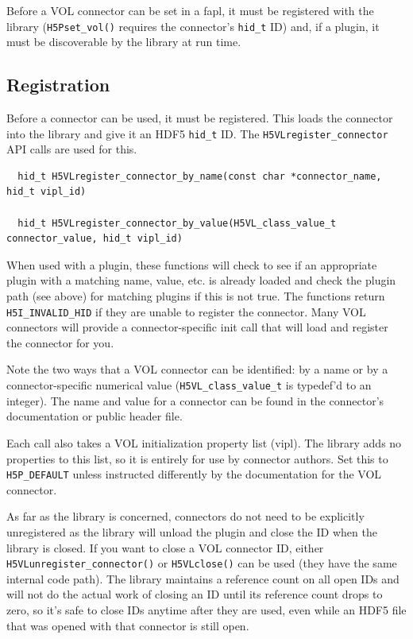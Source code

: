 Before a VOL connector can be set in a fapl, it must be registered with the library ({\tt H5Pset\_vol()} requires the connector's {\tt hid\_t} ID) and, if a plugin, it must be discoverable by the library at run time.

\subsection{Registration}

Before a connector can be used, it must be registered. This loads the connector into the library and give it an HDF5 {\tt hid\_t} ID. The {\tt H5VLregister\_connector} API calls are used for this.

\begin{lstlisting}
  hid_t H5VLregister_connector_by_name(const char *connector_name, hid_t vipl_id)

  hid_t H5VLregister_connector_by_value(H5VL_class_value_t connector_value, hid_t vipl_id)
\end{lstlisting}

When used with a plugin, these functions will check to see if an appropriate plugin with a matching name, value, etc. is already loaded and check the plugin path (see above) for matching plugins if this is not true. The functions return {\tt H5I\_INVALID\_HID} if they are unable to register the connector. Many VOL connectors will provide a connector-specific init call that will load and register the connector for you.

Note the two ways that a VOL connector can be identified: by a name or by a connector-specific numerical value ({\tt H5VL\_class\_value\_t} is typedef'd to an integer). The name and value for a connector can be found in the connector's documentation or public header file.

Each call also takes a VOL initialization property list (vipl). The library adds no properties to this list, so it is entirely for use by connector authors. Set this to {\tt H5P\_DEFAULT} unless instructed differently by the documentation for the VOL connector.

As far as the library is concerned, connectors do not need to be explicitly unregistered as the library will unload the plugin and close the ID when the library is closed. If you want to close a VOL connector ID, either {\tt H5VLunregister\_connector()} or {\tt H5VLclose()} can be used (they have the same internal code path). The library maintains a reference count on all open IDs and will not do the actual work of closing an ID until its reference count drops to zero, so it's safe to close IDs anytime after they are used, even while an HDF5 file that was opened with that connector is still open.

